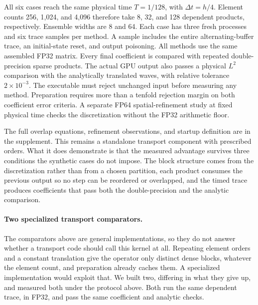 All six cases reach the same physical time \(T=1/128\), with
\(\Delta t=h/4\). Element counts 256, 1,024, and 4,096 therefore take
8, 32, and 128 dependent products, respectively. Ensemble widths are 8 and 64.
Each case has three fresh processes and six trace samples per method.
A sample includes the entire alternating-buffer trace, an initial-state
reset, and output poisoning. All methods use the same assembled FP32 matrix.
Every final coefficient is compared with repeated double-precision sparse
products. The actual GPU output also passes a physical \(L^2\) comparison
with the analytically translated waves, with relative tolerance \(2\times10^{-3}\).
The executable must reject unchanged input before measuring any method.
Preparation requires more than a tenfold rejection margin on both coefficient
error criteria. A separate FP64 spatial-refinement study at fixed physical
time checks the discretization without the FP32 arithmetic floor.

The full overlap equations, refinement observations, and startup definition
are in the supplement. This remains a standalone transport component with
prescribed orders. What it does demonstrate is that the measured advantage survives three
conditions the synthetic cases do not impose. The block structure comes
from the discretization rather than from a chosen partition, each product
consumes the previous output so no step can be reordered or overlapped, and
the timed trace produces coefficients that pass both the double-precision
and the analytic comparison.

\begin{table}[!htbp]
\centering\small
\caption{Complete transport traces to \(T=1/128\). Ratios divide comparator time
by direct time and first average paired process ratios in log space.
The best-library column includes both MAGMA compositions and all tested
NVIDIA controls. Times are direct GPU milliseconds per trace.}
\label{tab:transport}

\end{table}



\paragraph{Two specialized transport comparators.}
The comparators above are general implementations, so they do not answer
whether a transport code should call this kernel at all. Repeating element
orders and a constant translation give the operator only
\DgDistinctOperators{} distinct dense blocks, whatever the element count, and
preparation already caches them. A specialized implementation would exploit
that. We built two, differing in what they give up, and measured both under the
protocol above. Both run the same dependent trace, in FP32, and pass the same
coefficient and analytic checks.

